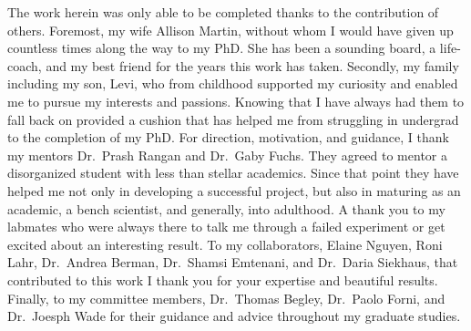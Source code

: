 \documentclass[12pt,oneside]{reedthesis}
\begin{document}
  \begin{acknowledgements}
  \pagestyle{plain}
    The work herein was only able to be completed thanks to the contribution of others. Foremost, my wife Allison Martin, without whom I would have given up countless times along the way to my PhD. She has been a sounding board, a life-coach, and my best friend for the years this work has taken.
    Secondly, my family including my son, Levi, who from childhood supported my curiosity and enabled me to pursue my interests and passions. Knowing that I have always had them to fall back on provided a cushion that has helped me from struggling in undergrad to the completion of my PhD.
    For direction, motivation, and guidance, I thank my mentors Dr.~Prash Rangan and Dr.~Gaby Fuchs. They agreed to mentor a disorganized student with less than stellar academics. Since that point they have helped me not only in developing a successful project, but also in maturing as an academic, a bench scientist, and generally, into adulthood.
    A thank you to my labmates who were always there to talk me through a failed experiment or get excited about an interesting result.
    To my collaborators, Elaine Nguyen, Roni Lahr, Dr.~Andrea Berman, Dr.~Shamsi Emtenani, and Dr.~Daria Siekhaus, that contributed to this work I thank you for your expertise and beautiful results.
    Finally, to my committee members, Dr.~Thomas Begley, Dr.~Paolo Forni, and Dr.~Joesph Wade for their guidance and advice throughout my graduate studies.
  \end{acknowledgements}
\end{document}
